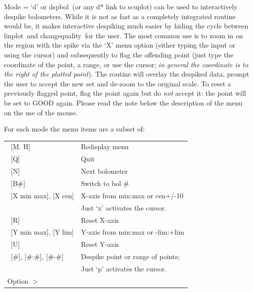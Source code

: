 \documentclass[twoside,11pt]{article}
\newcommand{\task}[1]{{\sf #1}}
\newcommand{\chgqual}{\htmlref{\task{change\_quality}}{CHANGE_QUALITY}}
\newcommand{\dspbol}{\htmlref{\task{dspbol}}{DSPBOL}}
\newcommand{\linplot}{\xref{\task{linplot}}{sun95}{LINPLOT}}
\newcommand{\htmlref}[2]{#1}
\newcommand{\xref}[3]{#1}
\renewcommand{\_}{\texttt{\symbol{95}}}
\begin{document}
{{      Mode = `d' or \dspbol\ (or any d$*$ link to scuplot) can be used to
      interactively despike bolometers. While it is not as fast as a
      completely integrated routine would be, it makes interactive
      despiking much easier by hiding the cycle between \linplot\ and
      \chgqual\ for the user. The most common use is to zoom in on
      the region with the spike via the `X' menu option (either typing
      the input or using the cursor) and subsequently to flag the
      offending point (just type the coordinate of the point, a range, or
      use the cursor; \textit{in general the coordinate is to the right of the
      plotted point}). The routine will overlay the despiked data, prompt
      the user to accept the new set and de-zoom to the original
      scale. To reset a previously flagged point, flag the point again
      but do \textit{not} accept it: the point will be set to GOOD again.  
      Please read the note below the description of the menu on the use of the
      mouse.

      For each mode the menu items are a subset of:

\begin{center}
\begin{tabular}{ll}	
\        [M. H]                & Redisplay menu\\   
\        [Q]                   &Quit\\
\        [N]                   &Next bolometer\\
\        [B\#]                  &Switch to bol \#\\
\        [X min max], [X cen]  &X-axis from min:max or cen+/-10\\
\                              &Just `x' activates the cursor.\\
\        [R]                   &Reset X-axis\\
\        [Y min max], [Y lim]  &Y-axis from min:max or -lim:+lim\\
\        [U]                   &Reset Y-axis\\
\        [\#], [\#:\#], [\#-\#]     &Despike point or range of points;\\
                              &Just `p' activates the cursor.\\

        Option $>$ & \\
\end{tabular}
\end{center}

}}
\end{document}

